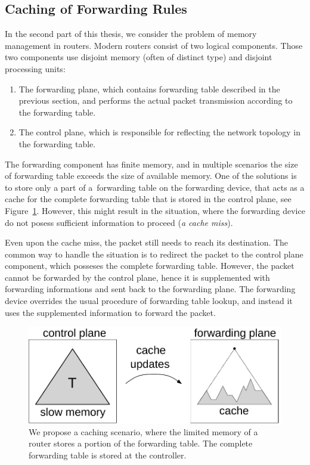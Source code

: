 \subsection{Caching of Forwarding Rules}

In the second part of this thesis, we consider the problem of memory management in routers.
Modern routers consist of two logical components. Those two components use disjoint memory (often of distinct type) and disjoint processing units:
\begin{enumerate}
  \item The forwarding plane, which  contains forwarding table described in the previous section, and performs the actual packet transmission according to the forwarding table.
  \item The control plane, which is responsible for reflecting the network topology in the forwarding table.
\end{enumerate}

The forwarding component has finite memory, and in multiple scenarios the size of forwarding table exceeds the size of available memory.
One of the solutions is to store only a part of a~forwarding table on the forwarding device, that acts as a cache for the complete forwarding table that is stored in the control plane, see Figure~\ref{fig:router}.
However, this might result in the situation, where the forwarding device do not posess sufficient information to proceed (\emph{a cache miss}).

Even upon the cache miss, the packet still needs to reach its destination.
The common way to handle the situation is to redirect the packet to the control plane component, which posseses the complete forwarding table.
However, the packet cannot be forwarded by the control plane, hence it is supplemented with forwarding informations and sent back to the forwarding plane.
The forwarding device overrides the usual procedure of forwarding table lookup, and instead it uses the supplemented information to forward the packet.


\begin{figure}[t]
\centering
\includegraphics[width=0.59\columnwidth]{figs/router5.pdf}
\caption{We propose a caching scenario, where the limited memory of a router stores a portion of the forwarding table. The complete forwarding table is stored at the controller.}\label{fig:router}
\vspace{-1em}
\end{figure}




